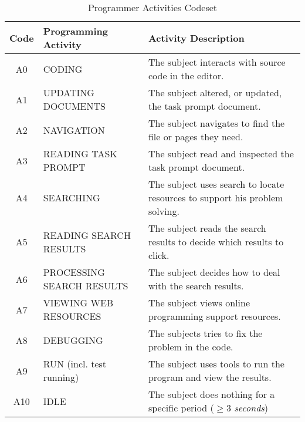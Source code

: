 
\begin{table*}[!htbp]
\caption{Programmer Activities Codeset}
\label{tab:programming-activities}
\centering
\begin{tabularx}{0.92\textwidth}{>{\rowmac}c | >{\rowmac}l | L}
\toprule
	Code & Programming Activity & Activity Description \\
\midrule
	A0 & CODING & The subject interacts with source code in the editor. \\
	A1 & UPDATING DOCUMENTS & The subject altered, or updated, the task prompt document. \\
	A2 & NAVIGATION & The subject navigates to find the file or pages they need. \\
	A3 & READING TASK PROMPT & The subject read and inspected the task prompt document. \\
	A4 & SEARCHING & The subject uses search to locate resources to support his problem solving. \\
	A5 & READING SEARCH RESULTS & The subject reads the search results to decide which results to click. \\
	A6 & PROCESSING SEARCH RESULTS & The subject decides how to deal with the search results. \\
	A7 & VIEWING WEB RESOURCES & The subject views online programming support resources. \\
	A8 & DEBUGGING & The subjects tries to fix the problem in the code. \\
    A9 & RUN (incl. test running) & The subject uses tools to run the program and view the results. \\
    A10 & IDLE & The subject does nothing for a specific period ($\geq\!3$ \textit{seconds}) \\
\bottomrule
\end{tabularx}
\end{table*}

